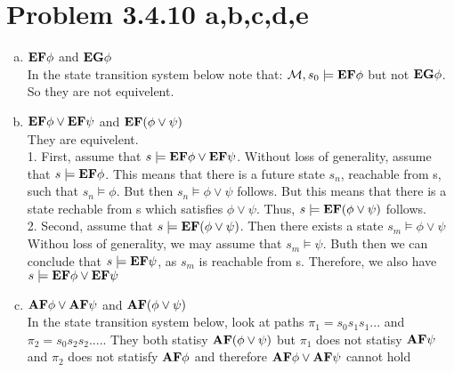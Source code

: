 \documentclass[11pt,leqno,fleqn]{article}
\begin{document}
\section{Problem 3.4.10 a,b,c,d,e}
\begin{enumerate}[(a)]

\item $\bold{EF}\phi$ and $\bold{EG}\phi$\\
In the state transition system below note that: $\mathcal{M},s_0 \models \bold{EF}\phi $ but not   $\bold{EG}\phi$. So they are not equivelent.\\

\item $\bold{EF}\phi \lor \bold{EF}\psi$ and $\bold{EF}(\phi \lor \psi)$\\
They are equivelent.\\
1. First, assume that $s \models \bold{EF}\phi \lor \bold{EF}\psi$. Without loss of generality, assume that $s \models \bold{EF}\phi$. This means that there is a future state $s_n$, reachable from s, such that $s_n \models \phi$. But then $s_n \models \phi \lor \psi$ follows. But this means that there is a state rechable from s which satisfies $\phi \lor \psi$. Thus, $s \models \bold{EF}(\phi \lor \psi)$ follows.\\
2. Second, assume that $s \models \bold{EF}(\phi \lor \psi)$. Then there exists a state $s_m \models \phi \lor \psi$Withou loss of generality, we may assume that $s_m \models \psi$. Buth then we can conclude that $s \models \bold{EF} \psi$, as $s_m$ is reachable from s. Therefore, we also have $s \models \bold{EF} \phi \lor \bold{EF}\psi$
\item  $\bold{AF}\phi \lor \bold{AF} \psi$ and $\bold{AF}(\phi \lor \psi)$\\
In the state transition system below, look at paths $\pi_1 = s_0 s_1 s_1...$ and $\pi_2 = s_0 s_2 s_2 ....$. They both statisy  $\bold{AF}(\phi \lor \psi)$ but $\pi_1$ does not statisy $\bold{AF}\psi$ and $\pi_2$ does not statisfy $\bold{AF}\phi$  and therefore $\bold{AF}\phi \lor \bold{AF} \psi$ cannot hold  \\
\begin{tikzpicture}[->,>=stealth',shorten >=1pt,auto,node distance=3cm,
                    thick,main node/.style={circle,draw,font=\sffamily\Large\bfseries}]



\end{tikzpicture}
\end{enumerate}
\end{document}
